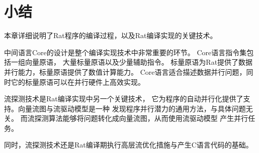 \section{小结}
本章详细说明了Rat程序的编译过程，以及Rat编译实现的关键技术。

中间语言Core的设计是整个编译实现技术中非常重要的环节。
Core语言指令集包括一组向量原语，
大量标量原语以及少量辅助指令。
标量原语为Rat提供了数据并行能力，标量原语提供了数值计算能力。
Core语言适合描述数据并行问题，同时它的标量原语可以在并行硬件上高效实现。

流探测技术是Rat编译实现中另一个关键技术，
它为程序的自动并行化提供了支持。向量流图与流驱动模型是一种
发现程序并行潜力的通用方法，与具体问题无关。
而流探测算法能够将问题转化成向量流图，从而使用流驱动模型
产生并行任务。

同时，流探测技术还是Rat编译期执行高层流优化措施与产生C语言代码的基础。

